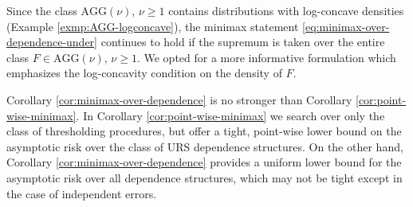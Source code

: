 \begin{remark}
Since the class $\text{AGG}(\nu)$, $\nu\ge1$ contains distributions with log-concave densities (Example \ref{exmp:AGG-logconcave}), the minimax statement \eqref{eq:minimax-over-dependence-under} continues to hold if the supremum is taken over the entire class $F\in\text{AGG}(\nu)$, $\nu\ge1$.
We opted for a more informative formulation which emphasizes the log-concavity condition on the density of $F$.
\end{remark}

\begin{remark}
Corollary \ref{cor:minimax-over-dependence} is no stronger than Corollary \ref{cor:point-wise-minimax}. 
In Corollary \ref{cor:point-wise-minimax} we search over only the class of thresholding procedures, but offer a tight, point-wise lower bound on the asymptotic risk over the class of URS dependence structures.
On the other hand, Corollary \ref{cor:minimax-over-dependence} provides a uniform lower bound for the asymptotic risk over all dependence structures, which may not be tight except in the case of independent errors.
\end{remark}



